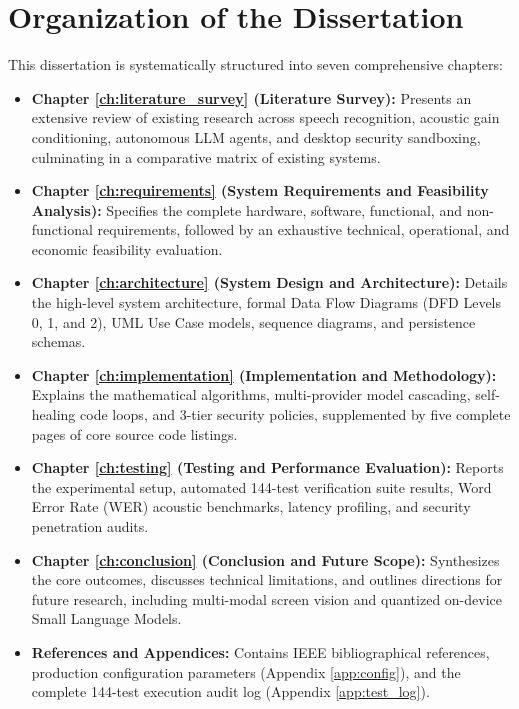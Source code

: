 \section{Organization of the Dissertation}
This dissertation is systematically structured into seven comprehensive chapters:
\begin{itemize}
    \item \textbf{Chapter \ref{ch:literature_survey} (Literature Survey):} Presents an extensive review of existing research across speech recognition, acoustic gain conditioning, autonomous LLM agents, and desktop security sandboxing, culminating in a comparative matrix of existing systems.
    \item \textbf{Chapter \ref{ch:requirements} (System Requirements and Feasibility Analysis):} Specifies the complete hardware, software, functional, and non-functional requirements, followed by an exhaustive technical, operational, and economic feasibility evaluation.
    \item \textbf{Chapter \ref{ch:architecture} (System Design and Architecture):} Details the high-level system architecture, formal Data Flow Diagrams (DFD Levels 0, 1, and 2), UML Use Case models, sequence diagrams, and persistence schemas.
    \item \textbf{Chapter \ref{ch:implementation} (Implementation and Methodology):} Explains the mathematical algorithms, multi-provider model cascading, self-healing code loops, and 3-tier security policies, supplemented by five complete pages of core source code listings.
    \item \textbf{Chapter \ref{ch:testing} (Testing and Performance Evaluation):} Reports the experimental setup, automated 144-test verification suite results, Word Error Rate (WER) acoustic benchmarks, latency profiling, and security penetration audits.
    \item \textbf{Chapter \ref{ch:conclusion} (Conclusion and Future Scope):} Synthesizes the core outcomes, discusses technical limitations, and outlines directions for future research, including multi-modal screen vision and quantized on-device Small Language Models.
    \item \textbf{References and Appendices:} Contains IEEE bibliographical references, production configuration parameters (Appendix \ref{app:config}), and the complete 144-test execution audit log (Appendix \ref{app:test_log}).
\end{itemize}
